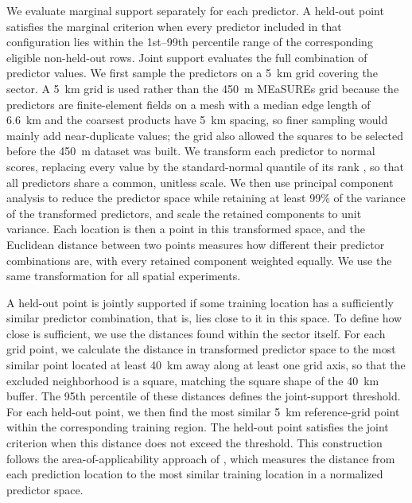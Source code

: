 \documentclass[review,jog]{igs}
\begin{document}
We evaluate marginal support separately for each predictor. A held-out point satisfies the marginal criterion when every predictor included in that configuration lies within the 1st--99th percentile range of the corresponding eligible non-held-out rows. Joint support evaluates the full combination of predictor values. We first sample the predictors on a 5~km grid covering the sector. A 5~km grid is used rather than the 450~m MEaSUREs grid because the predictors are finite-element fields on a mesh with a median edge length of 6.6~km and the coarsest products have 5~km spacing, so finer sampling would mainly add near-duplicate values; the grid also allowed the squares to be selected before the 450~m dataset was built. We transform each predictor to normal scores, replacing every value by the standard-normal quantile of its rank \citep{beasley2009rank}, so that all predictors share a common, unitless scale. We then use principal component analysis \citep{jolliffe2016principal} to reduce the predictor space while retaining at least 99\% of the variance of the transformed predictors, and scale the retained components to unit variance. Each location is then a point in this transformed space, and the Euclidean distance between two points measures how different their predictor combinations are, with every retained component weighted equally. We use the same transformation for all spatial experiments.

A held-out point is jointly supported if some training location has a sufficiently similar predictor combination, that is, lies close to it in this space. To define how close is sufficient, we use the distances found within the sector itself. For each grid point, we
calculate the distance in transformed predictor space to the most similar point
located at least 40~km away along at least one grid axis, so that the excluded
neighborhood is a square, matching the square shape of the 40~km buffer. The 95th percentile of these distances defines the
joint-support threshold. For each held-out
point, we then find the most similar 5~km reference-grid point within the corresponding training region. The held-out point satisfies the joint criterion when this distance does not exceed the threshold. This construction follows the area-of-applicability approach of \citet{meyer2021predicting}, which measures the distance from each prediction location to the most similar training location in a normalized predictor space.
\end{document}
